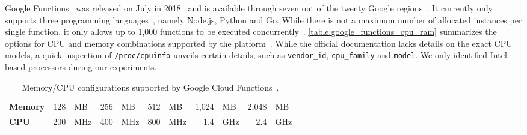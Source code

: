 Google Functions~\cite{GoogleFunctions} was released on July in 2018~\cite{GoogleFunctionsReleases} and is available through seven out of the twenty Google regions~\cite{GoogleFunctionsLocations}.
It currently only supports three programming languages~\cite{GoogleFunctionsLanguages}, namely Node.js, Python and Go. 
While there is not a maximum number of allocated instances per single function, it only allows up to 1,000 functions to be executed concurrently~\cite{GoogleFunctionsQuotas}.
\autoref{table:google_functions_cpu_ram} summarizes the options for CPU and memory combinations supported by the platform~\cite{GoogleFunctionsPricing}.
While the official documentation lacks details on the exact CPU models, a quick inspection of \texttt{/proc/cpuinfo} unveils certain details, such as \texttt{vendor\_id}, \texttt{cpu\_family} and \texttt{model}.
We only identified Intel-based processors during our experiments.

\begin{table}[!t]
\small
\setlength{\tabcolsep}{1pt}
\caption{Memory/CPU configurations supported by Google Cloud Functions~\cite{GoogleFunctionsPricing}.}
\centering
\begin{tabular}{l@{\hskip 3pt}|@{\hskip 3pt}rl@{\hskip 3pt}|@{\hskip 3pt}rl@{\hskip 3pt}|@{\hskip 3pt}rl@{\hskip 3pt}|@{\hskip 3pt}rl@{\hskip 3pt}|@{\hskip 3pt}rl} 
 \hline
	\textbf{Memory} & 128&\gls{MB}  & 256&\gls{MB}  & 512&\gls{MB}  & 1,024&\gls{MB}  & 2,048&\gls{MB} \\ 
	\textbf{CPU}    & 200&\gls{MHz} & 400&\gls{MHz} & 800&\gls{MHz} &   1.4&\gls{GHz} &   2.4&\gls{GHz} \\
	\hline
\end{tabular}
\vspace{-10pt}
\label{table:google_functions_cpu_ram}
\end{table}

